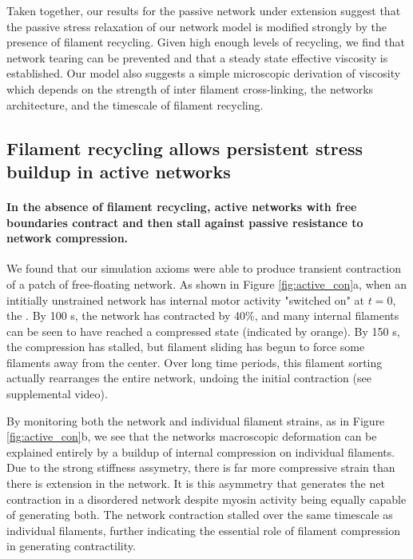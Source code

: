 \documentclass[10pt,letterpaper]{article}
\begin{document}
Taken together, our results for the passive network under extension suggest that the passive stress relaxation of our network model is modified strongly by the presence of filament recycling. Given high enough levels of recycling, we find that network tearing can be prevented and that a steady state effective viscosity is established. Our model also suggests a simple microscopic derivation of viscosity which depends on the strength of inter filament cross-linking, the networks architecture, and the timescale of filament recycling.








\subsection*{Filament recycling allows persistent stress buildup in active networks}

\paragraph{In the absence of filament recycling, active networks with free boundaries contract and then stall against passive resistance to network compression.}


We found that our simulation axioms were able to produce transient contraction of a patch of free-floating network.  As shown in Figure \ref{fig:active_con}a, when an intitially unstrained network has internal motor activity "switched on" at $t=0$, the .  By 100 s, the network has contracted by 40\%, and many internal filaments can be seen to have reached a compressed state (indicated by orange).  By 150 s, the compression has stalled, but filament sliding has begun to force some filaments away from the center. Over long time periods, this filament sorting actually rearranges the entire network, undoing the initial contraction (see supplemental video).

By monitoring both the network and individual filament strains, as in Figure \ref{fig:active_con}b, we see that the networks macroscopic deformation can be explained entirely by a buildup of internal compression on individual filaments.  Due to the strong stiffness assymetry, there is far more compressive strain than there is extension in the network. It is this asymmetry that generates the net contraction in a disordered network despite myosin activity being equally capable of generating both.  The network contraction stalled over the same timescale as individual filaments, further indicating the essential role of filament compression in generating contractility.  
\end{document}

